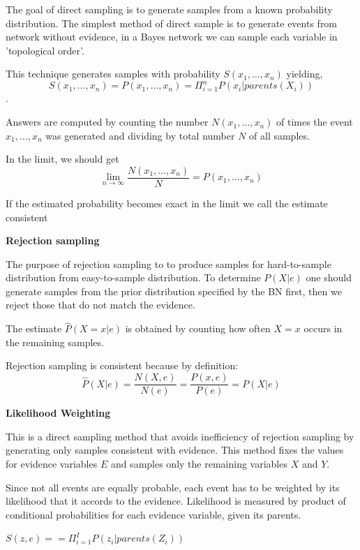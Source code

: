 \documentclass{article}
\begin{document}
The goal of direct sampling is to generate samples from a known probability distribution. The simplest method of direct sample is to generate events from network without evidence, in a Bayes network we can sample each variable in 'topological order'. 

This technique generates samples with probability $S(x_1, \ldots, x_n)$ yielding, $$S(x_1, \ldots, x_n) = P(x_1, \ldots, x_n) = \Pi_{i=1}^n P(x_i | parents(X_i))$$. 

Answers are computed by counting the number $N(x_1, \ldots, x_n)$ of times the event $x_1, \ldots, x_n$ was generated and dividing by total number $N$ of all samples.

In the limit, we should get $$\lim_{n \to \infty} \frac{N(x_1, \ldots, x_n)}{N} = P(x_1, \ldots, x_n)$$

If the estimated probability becomes exact in the limit we call the estimate consistent \newline

\textbf{Rejection sampling} \newline

The purpose of rejection sampling to to produce samples for hard-to-sample distribution from easy-to-sample distribution. To determine $P(X|e)$ one should generate samples from the prior distribution specified by the BN first, then we reject those that do not match the evidence. 

The estimate $\hat{P} (X = x|e)$ is obtained by counting how often $X = x$ occurs in the remaining samples.

Rejection sampling is consistent because by definition: $$\hat{P} (X|e) = \frac{N(X, e)}{N(e)} = \frac{P(x, e)}{P(e)} = P(X|e)$$ 

\textbf{Likelihood Weighting} \newline

This is a direct sampling method that avoids inefficiency of rejection sampling by generating only samples consistent with evidence. This method fixes the values for evidence variables $E$ and samples only the remaining variables $X$ and $Y$. \newline

Since not all events are equally probable, each event has to be weighted by its likelihood that it accords to the evidence. Likelihood is measured by product of conditional probabilities for each evidence variable, given its parents. 

 $S(z,e) = = \Pi_{i=1}^I P(z_i | parents(Z_i))$
\end{document}
